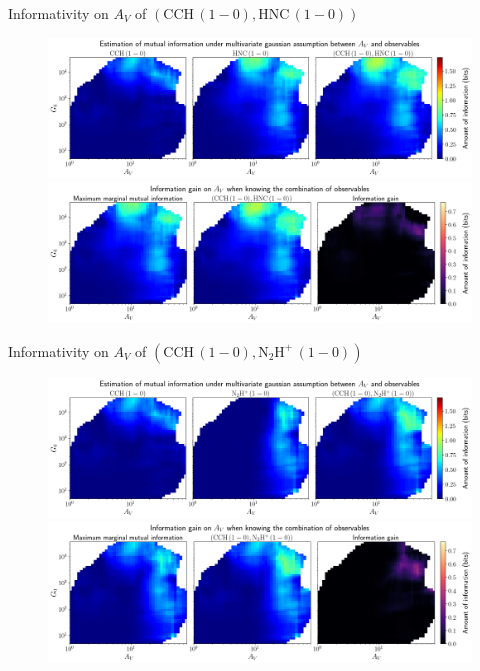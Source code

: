 \documentclass{beamer}
\begin{document}
\begin{frame}{Informativity on $A_V$ of $\left(\mathrm{CCH\,(1-0)},\mathrm{HNC\,(1-0)}\right)$}
    \begin{figure}
        \centering
        \includegraphics[width=0.95\linewidth]{../linearinfogauss/av__cch10_hnc10_linearinfogauss.png}
        \vfill
        \includegraphics[width=0.95\linewidth]{../linearinfogauss/av__cch10_hnc10_linearinfogauss_gain.png}
    \end{figure}
\end{frame}

\begin{frame}{Informativity on $A_V$ of $\left(\mathrm{CCH\,(1-0)},\mathrm{N_2H^+\,(1-0)}\right)$}
    \begin{figure}
        \centering
        \includegraphics[width=0.95\linewidth]{../linearinfogauss/av__cch10_n2hp10_linearinfogauss.png}
        \vfill
        \includegraphics[width=0.95\linewidth]{../linearinfogauss/av__cch10_n2hp10_linearinfogauss_gain.png}
    \end{figure}
\end{frame}
\end{document}
